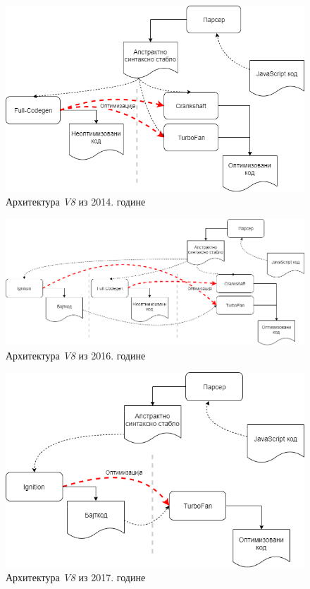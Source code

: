 \documentclass[12pt,oneside]{memoir}
\begin{document}
\begin{figure}
\begin{center}
\includegraphics[scale=0.5]{v8_3}
\caption{Архитектура \textit{V8} из 2014. године}
\label{img:V8_3}
\end{center}
\end{figure}

\begin{figure}
\begin{center}
\includegraphics[scale=0.4]{v8_4}
\caption{Архитектура \textit{V8} из 2016. године}
\label{img:V8_4}
\end{center}
\end{figure}

\begin{figure}
\begin{center}
\includegraphics[scale=0.5]{v8_5}
\caption{Архитектура \textit{V8} из 2017. године}
\label{img:V8_5}
\end{center}
\end{figure}
\end{document}
